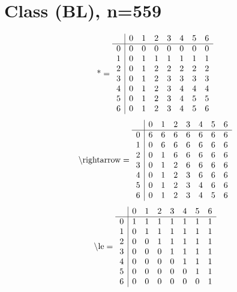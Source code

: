 \documentclass[11pt]{article}
\begin{document}
\section{Class (BL), n=559}
\[\text{*} = 
\begin{array}{r | r r r r r r r}
 & 0 & 1 & 2 & 3 & 4 & 5 & 6 \\ \hline
0 & 0 & 0 & 0 & 0 & 0 & 0 & 0 \\
1 & 0 & 1 & 1 & 1 & 1 & 1 & 1 \\
2 & 0 & 1 & 2 & 2 & 2 & 2 & 2 \\
3 & 0 & 1 & 2 & 3 & 3 & 3 & 3 \\
4 & 0 & 1 & 2 & 3 & 4 & 4 & 4 \\
5 & 0 & 1 & 2 & 3 & 4 & 5 & 5 \\
6 & 0 & 1 & 2 & 3 & 4 & 5 & 6 \\
\end{array}
\]
\[\text{\textbackslash rightarrow} = 
\begin{array}{r | r r r r r r r}
 & 0 & 1 & 2 & 3 & 4 & 5 & 6 \\ \hline
0 & 6 & 6 & 6 & 6 & 6 & 6 & 6 \\
1 & 0 & 6 & 6 & 6 & 6 & 6 & 6 \\
2 & 0 & 1 & 6 & 6 & 6 & 6 & 6 \\
3 & 0 & 1 & 2 & 6 & 6 & 6 & 6 \\
4 & 0 & 1 & 2 & 3 & 6 & 6 & 6 \\
5 & 0 & 1 & 2 & 3 & 4 & 6 & 6 \\
6 & 0 & 1 & 2 & 3 & 4 & 5 & 6 \\
\end{array}
\]
\[\text{\textbackslash le} = 
\begin{array}{r | r r r r r r r}
 & 0 & 1 & 2 & 3 & 4 & 5 & 6 \\ \hline
0 & 1 & 1 & 1 & 1 & 1 & 1 & 1 \\
1 & 0 & 1 & 1 & 1 & 1 & 1 & 1 \\
2 & 0 & 0 & 1 & 1 & 1 & 1 & 1 \\
3 & 0 & 0 & 0 & 1 & 1 & 1 & 1 \\
4 & 0 & 0 & 0 & 0 & 1 & 1 & 1 \\
5 & 0 & 0 & 0 & 0 & 0 & 1 & 1 \\
6 & 0 & 0 & 0 & 0 & 0 & 0 & 1 \\
\end{array}
\]
\end{document}
